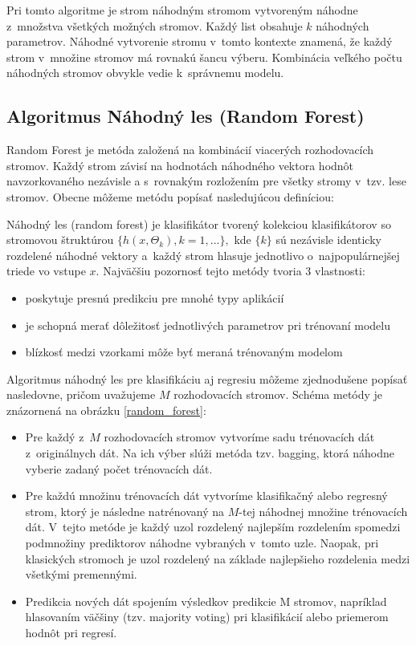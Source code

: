 Pri tomto algoritme je strom náhodným stromom vytvoreným náhodne z~množstva všetkých možných stromov. Každý list obsahuje $k$ náhodných parametrov. Náhodné vytvorenie stromu v~tomto kontexte znamená, že každý strom v~množine stromov má rovnakú šancu výberu. Kombinácia veľkého počtu náhodných stromov obvykle vedie k~správnemu modelu. 

\subsection{Algoritmus Náhodný les (Random Forest)}

Random Forest \cite{breiman} je metóda založená na kombinácií viacerých rozhodovacích stromov. Každý strom závisí na hodnotách náhodného vektora hodnôt navzorkovaného nezávisle a s~rovnakým rozložením pre všetky stromy v~tzv. lese stromov. Obecne môžeme metódu popísať nasledujúcou definíciou:

Náhodný les (random forest) je klasifikátor tvorený kolekciou klasifikátorov so stromovou štruktúrou $\{h(x,\Theta_{k}), k=1, ...\}, $ kde $\{k\}$ sú nezávisle identicky rozdelené náhodné vektory a~každý strom hlasuje jednotlivo o~najpopulárnejšej triede vo vstupe $x$.
\newpage
Najväčšiu pozornosť tejto metódy tvoria 3 vlastnosti:
\begin{itemize}
	\item poskytuje presnú predikciu pre mnohé typy aplikácií
	\item je schopná merať dôležitosť jednotlivých parametrov pri trénovaní modelu
	\item blízkosť medzi vzorkami môže byť meraná trénovaným modelom
\end{itemize} 

Algoritmus náhodný les pre klasifikáciu aj regresiu môžeme zjednodušene popísať nasledovne, pričom uvažujeme $M$ rozhodovacích stromov. Schéma metódy je znázornená na obrázku \ref{random_forest}:
\begin{itemize}
	\item Pre každý z~$M$ rozhodovacích stromov vytvoríme sadu trénovacích dát z~originálnych dát. Na ich výber slúži metóda tzv. bagging, ktorá náhodne vyberie zadaný počet trénovacích dát.
	\item Pre každú množinu trénovacích dát vytvoríme klasifikačný alebo regresný strom, ktorý je následne natrénovaný na $M$-tej náhodnej množine trénovacích dát. V~tejto metóde je každý uzol rozdelený najlepším rozdelením spomedzi podmnožiny prediktorov náhodne vybraných v~tomto uzle. Naopak, pri klasických stromoch je uzol rozdelený na základe najlepšieho rozdelenia medzi všetkými premennými.
	\item Predikcia nových dát spojením výsledkov predikcie M stromov, napríklad hlasovaním väčšiny (tzv. majority voting) pri klasifikácií alebo priemerom hodnôt pri regresí.
\end{itemize}


